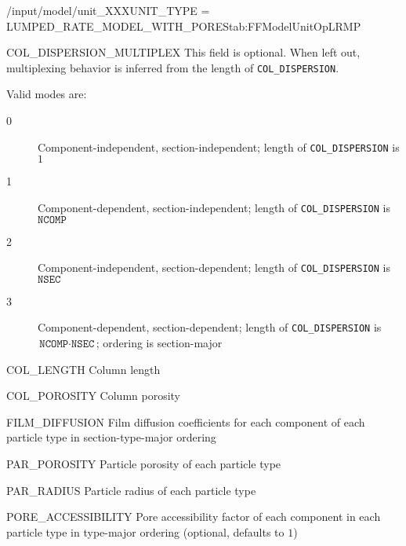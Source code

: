 \begin{condsubgroup}{/input/model/unit\_XXX}{UNIT\_TYPE = LUMPED\_RATE\_MODEL\_WITH\_PORES}{tab:FFModelUnitOpLRMP}
\begin{dataset}[unit=--,type=int,range={$\{0, \dots, 3 \}$},length={1}]{COL\_DISPERSION\_MULTIPLEX}
    This field is optional.
    When left out, multiplexing behavior is inferred from the length of \texttt{COL\_DISPERSION}.

    Valid modes are:
    \begin{description}
      \item[0] Component-independent, section-independent; length of \texttt{COL\_DISPERSION} is $1$
      \item[1] Component-dependent, section-independent; length of \texttt{COL\_DISPERSION} is $\texttt{NCOMP}$
      \item[2] Component-independent, section-dependent; length of \texttt{COL\_DISPERSION} is $\texttt{NSEC}$
      \item[3] Component-dependent, section-dependent; length of \texttt{COL\_DISPERSION} is $\texttt{NCOMP} \cdot \texttt{NSEC}$; ordering is section-major
    \end{description}\vspace{-\baselineskip}
  \end{dataset}
  \begin{dataset}[unit=\si{\metre},type=double,range={$> 0$},length={1}]{COL\_LENGTH}
    Column length
  \end{dataset}
  \begin{dataset}[unit=--,type=double,range={$(0,1]$},length={1}]{COL\_POROSITY}
    Column porosity
  \end{dataset}
  \begin{dataset}[unit=\si{\metre\per\second},type=double,range={$\geq 0$},length={$\texttt{NPARTYPE} \cdot \texttt{NCOMP}$ / $\texttt{NPARTYPE} \cdot \texttt{NCOMP} \cdot \texttt{NSEC}$}]{FILM\_DIFFUSION}
    Film diffusion coefficients for each component of each particle type in section-type-major ordering
  \end{dataset}
  \begin{dataset}[unit=--,type=double,range={$(0,1]$},length={\texttt{NPARTYPE}}]{PAR\_POROSITY}
    Particle porosity of each particle type
  \end{dataset}
  \begin{dataset}[unit=\si{\metre},type=double,range={$>0$},length={\texttt{NPARTYPE}}]{PAR\_RADIUS}
    Particle radius of each particle type
  \end{dataset}
  \begin{dataset}[unit=--,type=double,range={$(0, 1]$},length={$\texttt{NPARTYPE} \cdot \texttt{NCOMP}$}]{PORE\_ACCESSIBILITY}
    Pore accessibility factor of each component in each particle type in type-major ordering (optional, defaults to $1$)

\end{dataset}
\end{condsubgroup}
